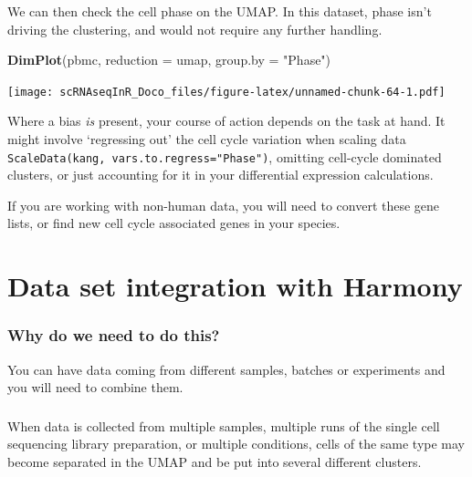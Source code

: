 \documentclass[
]{book}
\newenvironment{Shaded}{\begin{snugshade}}{\end{snugshade}}
\newcommand{\AttributeTok}[1]{\textcolor[rgb]{0.13,0.29,0.53}{#1}}
\newcommand{\FunctionTok}[1]{\textcolor[rgb]{0.13,0.29,0.53}{\textbf{#1}}}
\newcommand{\NormalTok}[1]{#1}
\newcommand{\StringTok}[1]{\textcolor[rgb]{0.31,0.60,0.02}{#1}}
\begin{document}
We can then check the cell phase on the UMAP. In this dataset, phase isn't driving the clustering, and would not require any further handling.

\begin{Shaded}
\begin{Highlighting}[]
\FunctionTok{DimPlot}\NormalTok{(pbmc, }\AttributeTok{reduction =} \StringTok{\textquotesingle{}umap\textquotesingle{}}\NormalTok{, }\AttributeTok{group.by =} \StringTok{"Phase"}\NormalTok{)}
\end{Highlighting}
\end{Shaded}

\texttt{[image: scRNAseqInR\_Doco\_files/figure-latex/unnamed-chunk-64-1.pdf]}

Where a bias \emph{is} present, your course of action depends on the task at hand. It might involve `regressing out' the cell cycle variation when scaling data \texttt{ScaleData(kang,\ vars.to.regress="Phase")}, omitting cell-cycle dominated clusters, or just accounting for it in your differential expression calculations.

If you are working with non-human data, you will need to convert these gene lists, or find new cell cycle associated genes in your species.

\hypertarget{Harmony}{%
\chapter{Data set integration with Harmony}\label{Harmony}}

\hypertarget{why-do-we-need-to-do-this-8}{%
\subsection*{Why do we need to do this?}\label{why-do-we-need-to-do-this-8}}

You can have data coming from different samples, batches or experiments and you will need to combine them.

\hypertarget{section-12}{%
\subsection*{}\label{section-12}}

When data is collected from multiple samples, multiple runs of the single cell sequencing library preparation, or multiple conditions, cells of the same type may become separated in the UMAP and be put into several different clusters.
\end{document}
